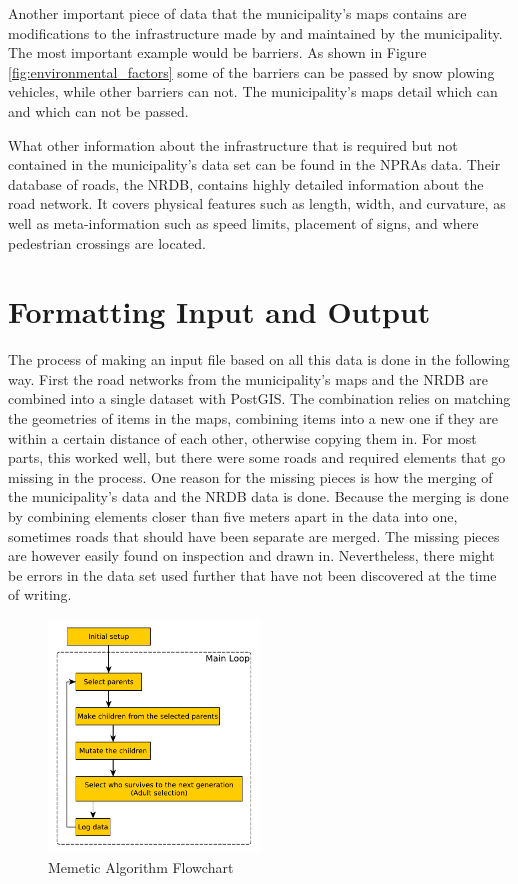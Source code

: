 Another important piece of data that the municipality's maps contains are modifications to the infrastructure made by and maintained by the municipality. The most important example would be barriers. As shown in Figure \ref{fig:environmental_factors} some of the barriers can be passed by snow plowing vehicles, while other barriers can not. The municipality's maps detail which can and which can not be passed.

What other information about the infrastructure that is required but not contained in the municipality's data set can be found in the NPRAs data. Their database of roads, the NRDB, contains highly detailed information about the road network. It covers physical features such as length, width, and curvature, as well as meta-information such as speed limits, placement of signs, and where pedestrian crossings are located.

\section{Formatting Input and Output} %
\label{sec:achitecture_formatting_input_and_output}

The process of making an input file based on all this data is done in the following way. First the road networks from the municipality's maps and the NRDB are combined into a single dataset with PostGIS. The combination relies on matching the geometries of items in the maps, combining items into a new one if they are within a certain distance of each other, otherwise copying them in. For most parts, this worked well, but there were some roads and required elements that go missing in the process. One reason for the missing pieces is how the merging of the municipality's data and the NRDB data is done. Because the merging is done by combining elements closer than five meters apart in the data into one, sometimes roads that should have been separate are merged. The missing pieces are however easily found on inspection and drawn in. Nevertheless, there might be errors in the data set used further that have not been discovered at the time of writing.

\begin{figure}
    \begin{center}
        \includegraphics[width=0.5\textwidth]{figures/Architecture/MA_flowchart.pdf}
    \end{center}
    \caption{Memetic Algorithm Flowchart}
    \label{fig:ma_flowchart}
\end{figure}

